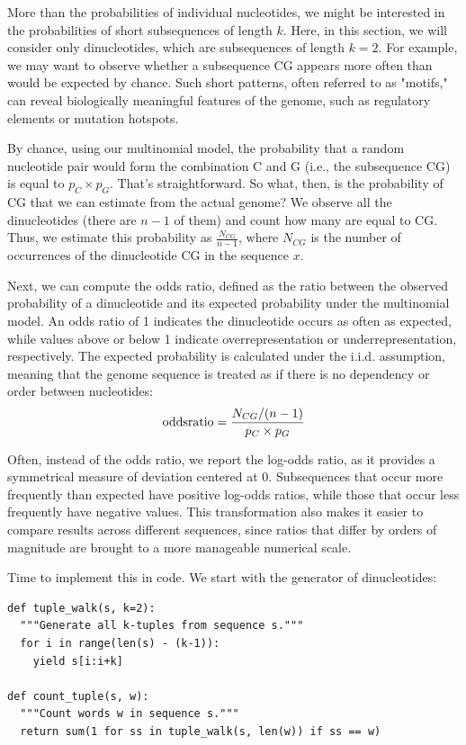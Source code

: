 More than the probabilities of individual nucleotides, we might be interested in the probabilities of short subsequences of length $k$. Here, in this section, we will consider only dinucleotides, which are subsequences of length $k=2$. For example, we may want to observe whether a subsequence CG appears more often than would be expected by chance. Such short patterns, often referred to as "motifs," can reveal biologically meaningful features of the genome, such as regulatory elements or mutation hotspots.

By chance, using our multinomial model, the probability that a random nucleotide pair would form the combination C and G (i.e., the subsequence CG) is equal to $p_C \times p_G$. That’s straightforward. So what, then, is the probability of CG that we can estimate from the actual genome? We observe all the dinucleotides (there are $n - 1$ of them) and count how many are equal to CG. Thus, we estimate this probability as $\frac{N_{CG}}{n - 1}$, where $N_{CG}$ is the number of occurrences of the dinucleotide CG in the sequence $x$.

Next, we can compute the odds ratio, defined as the ratio between the observed probability of a dinucleotide and its expected probability under the multinomial model. An odds ratio of 1 indicates the dinucleotide occurs as often as expected, while values above or below 1 indicate overrepresentation or underrepresentation, respectively. The expected probability is calculated under the i.i.d. assumption, meaning that the genome sequence is treated as if there is no dependency or order between nucleotides:
\[
{\rm odds ratio} = \frac{N_{CG}/(n-1)}{p_C \times p_G}
\]

Often, instead of the odds ratio, we report the log-odds ratio, as it provides a symmetrical measure of deviation centered at 0. Subsequences that occur more frequently than expected have positive log-odds ratios, while those that occur less frequently have negative values. This transformation also makes it easier to compare results across different sequences, since ratios that differ by orders of magnitude are brought to a more manageable numerical scale.

Time to implement this in code. We start with the generator of dinucleotides:

\vspace*{3mm}
\begin{lstlisting}
def tuple_walk(s, k=2):
  """Generate all k-tuples from sequence s."""
  for i in range(len(s) - (k-1)):
    yield s[i:i+k]

def count_tuple(s, w):
  """Count words w in sequence s."""
  return sum(1 for ss in tuple_walk(s, len(w)) if ss == w)
\end{lstlisting}

